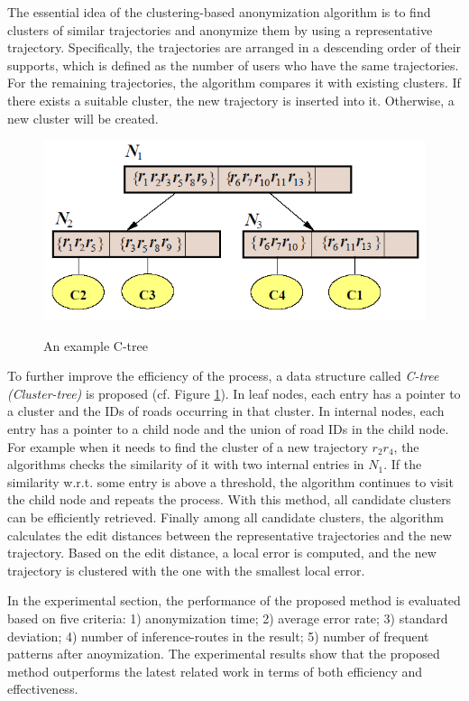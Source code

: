 \documentclass[paper=a4, fontsize=18pt]{article} %
\numberwithin{equation}{section} %
\numberwithin{figure}{section} %
\numberwithin{table}{section} %
\begin{document}
The essential idea of the clustering-based anonymization algorithm is to find clusters of similar trajectories and anonymize them by using a representative trajectory. Specifically, the trajectories are arranged in a descending order of their supports, which is defined as the number of users who have the same trajectories. For the remaining trajectories, the algorithm compares it with existing clusters. If there exists a suitable cluster, the new trajectory is inserted into it. Otherwise, a new cluster will be created.

\begin{figure}[h]
  \centering
  \includegraphics[width=.5\linewidth]{9_5_Ctree.png}\\
  \caption{An example C-tree}\label{fig:Ctree}
\end{figure}

To further improve the efficiency of the process, a data structure called \emph{C-tree (Cluster-tree)} is proposed (cf. Figure \ref{fig:Ctree}). In leaf nodes, each entry has a pointer to a cluster and the IDs of roads occurring in that cluster. In internal nodes, each entry has a pointer to a child node and the union of road IDs in the child node. For example when it needs to find the cluster of a new trajectory $r_2 r_4$, the algorithms checks the similarity of it with two internal entries in $N_1$. If the similarity w.r.t. some entry is above a threshold, the algorithm continues to visit the child node and repeats the process. With this method, all candidate clusters can be efficiently retrieved. Finally among all candidate clusters, the algorithm calculates the edit distances between the representative trajectories and the new trajectory. Based on the edit distance, a local error is computed, and the new trajectory is clustered with the one with the smallest local error.

In the experimental section, the performance of the proposed method is evaluated based on five criteria: 1) anonymization time; 2) average error rate; 3) standard deviation; 4) number of inference-routes in the result; 5) number of frequent patterns after anoymization. The experimental results show that the proposed method outperforms the latest related work in terms of both efficiency and effectiveness.
\end{document}
